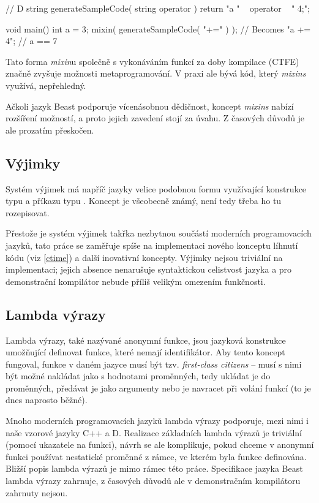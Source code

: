 \begin{dcode}
// D
string generateSampleCode( string operator ) {
	return "a " ~ operator ~ " 4;";
}

void main() {
	int a = 3;
	mixin( generateSampleCode( "+=" ) ); // Becomes "a += 4";
	// a == 7
}
\end{dcode}

Tato forma \textit{mixin}u společně s vykonáváním funkcí za doby kompilace (CTFE) značně zvyšuje možnosti metaprogramování. V praxi ale bývá kód, který \textit{mixins} využívá, nepřehledný.

Ačkoli jazyk Beast podporuje vícenásobnou dědičnost, koncept \textit{mixins} nabízí rozšíření možností, a proto jejich zavedení stojí za úvahu. Z časových důvodů je ale prozatím přeskočen.

\subsection{Výjimky}
Systém výjimek má napříč jazyky velice podobnou formu využívající konstrukce typu  a příkazu typu . Koncept je všeobecně známý, není tedy třeba ho tu rozepisovat.

Přestože je systém výjimek takřka nezbytnou součástí moderních programovacích jazyků, tato práce se zaměřuje spíše na implementaci nového konceptu líhnutí kódu (viz \autoref{ctime}) a další inovativní koncepty. Výjimky nejsou triviální na implementaci; jejich absence nenarušuje syntaktickou celistvost jazyka a pro demonstrační kompilátor nebude příliš velikým omezením funkčnosti.

\subsection{Lambda výrazy}
Lambda výrazy, také nazývané anonymní funkce, jsou jazyková konstrukce umožňující definovat funkce, které nemají identifikátor. Aby tento koncept fungoval, funkce v daném jazyce musí být tzv. \textit{first-class citizens} -- musí s nimi být možné nakládat jako s hodnotami proměnných, tedy ukládat je do proměnných, předávat je jako argumenty nebo je navracet při volání funkcí (to je dnes naprosto běžné).

Mnoho moderních programovacích jazyků lambda výrazy podporuje, mezi nimi i naše vzorové jazyky C++ a D. Realizace základních lambda výrazů je triviální (pomocí ukazatele na funkci), návrh se ale komplikuje, pokud chceme v anonymní funkci používat nestatické proměnné z rámce, ve kterém byla funkce definována. Bližší popis lambda výrazů je mimo rámec této práce. Specifikace jazyka Beast lambda výrazy zahrnuje, z časových důvodů ale v demonstračním kompilátoru zahrnuty nejsou.

